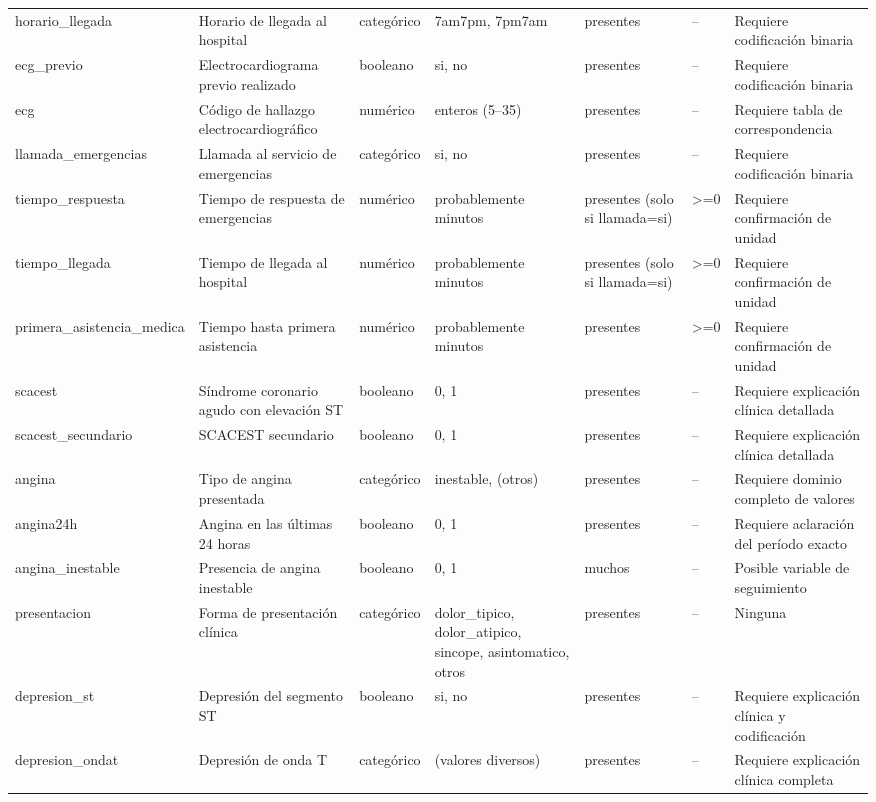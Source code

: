 \documentclass[11pt,a4paper]{article}
\begin{document}
\begin{longtable}{@{}L{0.095\textwidth} L{0.17\textwidth} L{0.07\textwidth} L{0.16\textwidth} L{0.14\textwidth} L{0.13\textwidth} L{0.15\textwidth}@{}}
horario\_llegada & Horario de llegada al hospital & categórico & 7am7pm, 7pm7am & presentes & -- & Requiere codificación binaria \\
ecg\_previo & Electrocardiograma previo realizado & booleano & si, no & presentes & -- & Requiere codificación binaria \\
ecg & Código de hallazgo electrocardiográfico & numérico & enteros (5--35) & presentes & -- & Requiere tabla de correspondencia \\
llamada\_emergencias & Llamada al servicio de emergencias & categórico & si, no & presentes & -- & Requiere codificación binaria \\
tiempo\_respuesta & Tiempo de respuesta de emergencias & numérico & probablemente minutos & presentes (solo si llamada=si) & >=0 & Requiere confirmación de unidad \\
tiempo\_llegada & Tiempo de llegada al hospital & numérico & probablemente minutos & presentes (solo si llamada=si) & >=0 & Requiere confirmación de unidad \\
primera\_asistencia\_medica & Tiempo hasta primera asistencia & numérico & probablemente minutos & presentes & >=0 & Requiere confirmación de unidad \\
scacest & Síndrome coronario agudo con elevación ST & booleano & 0, 1 & presentes & -- & Requiere explicación clínica detallada \\
scacest\_secundario & SCACEST secundario & booleano & 0, 1 & presentes & -- & Requiere explicación clínica detallada \\
angina & Tipo de angina presentada & categórico & inestable, (otros) & presentes & -- & Requiere dominio completo de valores \\
angina24h & Angina en las últimas 24 horas & booleano & 0, 1 & presentes & -- & Requiere aclaración del período exacto \\
angina\_inestable & Presencia de angina inestable & booleano & 0, 1 & muchos & -- & Posible variable de seguimiento \\
presentacion & Forma de presentación clínica & categórico & dolor\_tipico, dolor\_atipico, sincope, asintomatico, otros & presentes & -- & Ninguna \\
depresion\_st & Depresión del segmento ST & booleano & si, no & presentes & -- & Requiere explicación clínica y codificación \\
depresion\_ondat & Depresión de onda T & categórico & (valores diversos) & presentes & -- & Requiere explicación clínica completa \\

\end{longtable}
\end{document}
